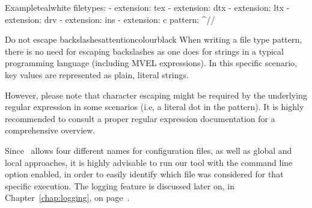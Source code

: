 \begin{description}
\begin{codebox}{Example}{teal}{\icnote}{white}
filetypes:
- extension: tex
- extension: dtx
- extension: ltx
- extension: drv
- extension: ins
- extension: c
  pattern: ^\s*//\s*
\end{codebox}

\begin{messagebox}{Do not escape backslashes}{attentioncolour}{\icattention}{black}
\setlength{\parskip}{1em}
When writing a file type pattern, there is no need for escaping backslashes as one does for strings in a typical programming language (including \gls{MVEL} expressions). In this specific scenario, key values are represented as plain, literal strings.

However, please note that character escaping might be required by the underlying regular expression in some scenarios (i.e, a literal dot in the pattern). It is highly recommended to consult a proper regular expression documentation for a comprehensive overview.
\end{messagebox}
\end{description}

Since \arara\ allows four different names for configuration files, as well as global and local approaches, it is highly advisable to run our tool with the  command line option enabled, in order to easily identify which file was considered for that specific execution. The logging feature is discussed later on, in Chapter~\ref{chap:logging}, on page~\pageref{chap:logging}.
